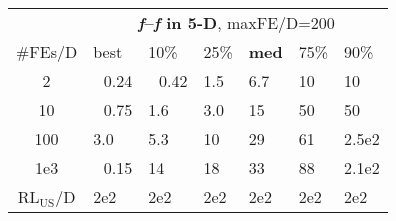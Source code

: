 \begin{tabular}{c|llllll}
 & \multicolumn{6}{|c}{\textbf{\textit{f}\raisebox{-0.35ex}{1}--\textit{f}\raisebox{-0.35ex}{24} in 5-D}, maxFE/D=200}\\
\#FEs/D & best & 10\% & 25\% & \textbf{med} & 75\% & 90\%\\
2 & ~\,0.24 & ~\,0.42 & \hspace*{1ex}1.5 & \hspace*{1ex}6.7 & 10 & 10\\
10 & ~\,0.75 & \hspace*{1ex}1.6 & \hspace*{1ex}3.0 & 15 & 50 & 50\\
100 & \hspace*{1ex}3.0 & \hspace*{1ex}5.3 & 10 & 29 & 61 & 2.5e2\\
1e3 & ~\,0.15 & 14 & 18 & 33 & 88 & 2.1e2\\
$\text{RL}_{\text{US}}$/D & 2e2 & 2e2 & 2e2 & 2e2 & 2e2 & 2e2
\end{tabular}
